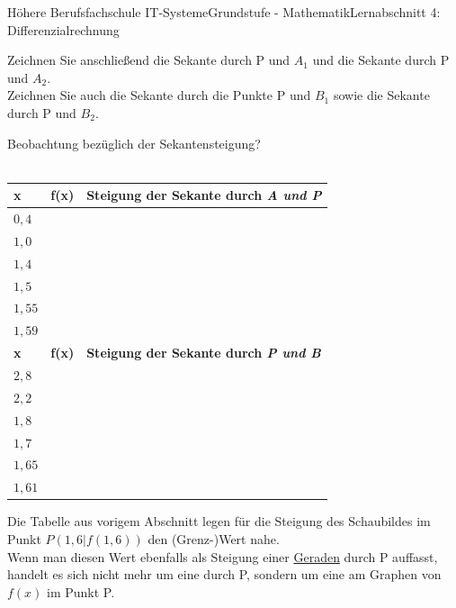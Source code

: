 \documentclass[oneside,openany,headings=optiontotoc,11pt,numbers=noenddot]{scrreprt}
\begin{document}
\begin{worksheet}{Höhere Berufsfachschule IT-Systeme}{Grundstufe - Mathematik}{Lernabschnitt 4: Differenzialrechnung}
\begin{framed}
			Zeichnen Sie anschließend die Sekante durch P und \(A_1\) und die Sekante durch P und \(A_2\).\\
			Zeichnen Sie auch die Sekante durch die Punkte P und \(B_1\) sowie die Sekante durch P und \(B_2\).\\
			\par\noindent
			Beobachtung bezüglich der Sekantensteigung?\\
			\colorbox{codegray!15}{\color{codegray!15}{Die Steigungen gleichen sich an. Die Sekanten nähern sich derselben Gerade an.Die Steigungen gleichen si}}\\
			\par\noindent
			\renewcommand{\arraystretch}{1.5}
			\begin{tabularx}{\textwidth}{L{1.5cm}|L{1.5cm}|M}
				 \textbf{x} & \textbf{f(x)} & \textbf{Steigung der Sekante durch \textit{A und P}}\\
				\hline
				\(0,4\) & & \\
				\hline
				\(1,0\) & & \\
				\hline
				\(1,4\) & & \\
				\hline
				\(1,5\) & & \\
				\hline
				\(1,55\) & & \\
				\hline
				\(1,59\) & & \\
				\hline
				\hline
				 \textbf{x} & \textbf{f(x)} & \textbf{Steigung der Sekante durch \textit{P und B}}\\
				\hline
				\(2,8\) & & \\
				\hline
				\(2,2\) & & \\
				\hline
				\(1,8\) & & \\
				\hline
				\(1,7\) & & \\
				\hline
				\(1,65\) & & \\
				\hline
				\(1,61\) & & \\
			\end{tabularx}
		\end{framed}
		\begin{framed}
			\noindent
			Die Tabelle aus vorigem Abschnitt legen für die Steigung des Schaubildes im Punkt \(P(1,6|f(1,6))\) den (Grenz-)Wert \colorbox{codegray!15}{\color{codegray!15}{0,76.....}} nahe.\\
			Wenn man diesen Wert ebenfalls als Steigung einer \underline{Geraden} durch P auffasst, handelt es sich nicht mehr um eine \colorbox{codegray!15}{\color{codegray!15}{SekanteSekanteSekanteSekante}} durch P, sondern um eine \colorbox{codegray!15}{\color{codegray!15}{Tangente tTangente tTangente t}} am Graphen von \(f(x)\) im Punkt P.
		\end{framed}
	\end{worksheet}
\end{document}
